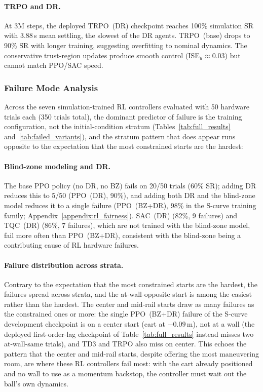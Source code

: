 \paragraph{TRPO and DR.}
At 3M steps, the deployed TRPO~(DR) checkpoint reaches 100\% simulation
SR with 3.88\,s mean settling, the slowest of the DR agents.
TRPO~(base) drops to 90\% SR with longer training,
suggesting overfitting to nominal dynamics.
The conservative trust-region updates produce smooth control
(ISE$_u \approx 0.03$) but cannot match PPO/SAC speed.

\subsubsection{Failure Mode Analysis}

Across the seven simulation-trained RL controllers evaluated with 50
hardware trials each (350 trials total), the dominant predictor of failure is
the training configuration, not the initial-condition stratum
(Tables~\ref{tab:full_results} and~\ref{tab:failed_variants}), and the stratum pattern that does appear runs
opposite to the expectation that the most constrained starts are the
hardest:

\paragraph{Blind-zone modeling and DR.}
The base PPO policy (no DR, no BZ) fails on 20/50 trials (60\% SR);
adding DR reduces this to 5/50 (PPO~(DR), 90\%), and adding both DR
and the blind-zone model reduces it to a single failure
(PPO~(BZ+DR), 98\% in the S-curve training family;
Appendix~\ref{appendix:rl_fairness}). SAC~(DR)
(82\%, 9 failures) and TQC~(DR) (86\%, 7 failures), which are not
trained with the blind-zone model, fail more often than PPO~(BZ+DR),
consistent with the blind-zone being a contributing cause of RL
hardware failures.

\paragraph{Failure distribution across strata.}
Contrary to the expectation that the most constrained starts are the hardest,
the failures spread across strata, and the at-wall-opposite start is among the
easiest rather than the hardest. The center and mid-rail starts draw as many
failures as the constrained ones or more: the single PPO~(BZ+DR) failure of the
S-curve development checkpoint is on a center start (cart at $-0.09$\,m), not at
a wall (the deployed first-order-lag checkpoint of Table~\ref{tab:full_results}
instead misses two at-wall-same trials), and TD3 and TRPO also miss on center. This echoes the pattern that the center and
mid-rail starts, despite offering the most maneuvering room, are where these
RL controllers fail most: with the cart already positioned and no wall to use
as a momentum backstop, the controller must wait out the ball's own dynamics.

